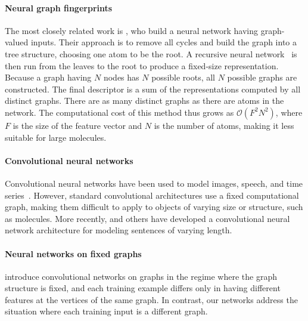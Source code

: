 \documentclass{article}
\newcommand{\citep}{\cite}
\newcommand{\citet}{\cite}
\begin{document}
\paragraph{Neural graph fingerprints}
The most closely related work is \citet{lusci2013deep}, who build a neural network having graph-valued inputs.
Their approach is to remove all cycles and build the graph into a tree structure, choosing one atom to be the root.
A recursive neural network~\citep{socher2011dynamic, socher2011semi} is then run from the leaves to the root to produce a fixed-size representation.
Because a graph having $N$ nodes has $N$ possible roots, all $N$ possible graphs are constructed.
The final descriptor is a sum of the representations computed by all distinct graphs.
There are as many distinct graphs as there are atoms in the network.
The computational cost of this method thus grows as $\mathcal{O}(F^2N^2)$, where $F$ is the size of the feature vector and $N$ is the number of atoms, making it less suitable for large molecules.

\paragraph{Convolutional neural networks}
Convolutional neural networks have been used to model images, speech, and time series~\citep{lecun1995convolutional}.
However, standard convolutional architectures use a fixed computational graph, making them difficult to apply to objects of varying size or structure, such as molecules.
More recently, \cite{KalchbrennerACL2014} and others have developed a convolutional neural network architecture for modeling sentences of varying length.



\paragraph{Neural networks on fixed graphs}
\cite{bruna2013spectral} introduce convolutional networks on graphs in the regime where the graph structure is fixed, and each training example differs only in having different features at the vertices of the same graph.
In contrast, our networks address the situation where each training input is a different graph.
\end{document}
